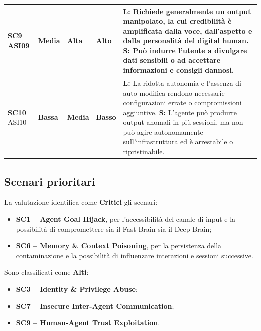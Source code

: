 \documentclass[11pt,a4paper]{article}
\newcommand{\alto}{\cellcolor{RiskHigh}\textbf{Alto}}
\newcommand{\basso}{\cellcolor{RiskLow}\textbf{Basso}}
\begin{document}
\begin{longtable}{
    |C{1.45cm}|
    C{1.65cm}|
    C{1.65cm}|
    C{1.45cm}|
    L{\dimexpr\textwidth-1.45cm-1.65cm-1.65cm-1.45cm-10\arrayrulewidth\relax}|
}
\textbf{SC9} \newline ASI09
&
\textbf{Media}
&
\textbf{Alta}
&
\alto
&
\textbf{L:}
Richiede generalmente un output manipolato, la cui credibilità è
amplificata dalla voce, dall'aspetto e dalla personalità del digital
human.
\newline \textbf{S:}
Può indurre l'utente a divulgare dati sensibili o ad accettare
informazioni e consigli dannosi.
\\
\hline


\textbf{SC10} \newline ASI10
&
\textbf{Bassa}
&
\textbf{Media}
&
\basso
&
\textbf{L:}
La ridotta autonomia e l'assenza di auto-modifica rendono necessarie
configurazioni errate o compromissioni aggiuntive.
\newline \textbf{S:}
L'agente può produrre output anomali in più sessioni, ma non può agire
autonomamente sull'infrastruttura ed è arrestabile o ripristinabile.
\\
\hline

\end{longtable}
\endgroup





\subsection{Scenari prioritari}

La valutazione identifica come \textbf{Critici} gli scenari:

\begin{itemize}
    \item \textbf{SC1 -- Agent Goal Hijack}, per l'accessibilità del
    canale di input e la possibilità di compromettere sia il
    Fast-Brain sia il Deep-Brain;

    \item \textbf{SC6 -- Memory \& Context Poisoning}, per la
    persistenza della contaminazione e la possibilità di influenzare
    interazioni e sessioni successive.
\end{itemize}

Sono classificati come \textbf{Alti}:

\begin{itemize}
    \item \textbf{SC3 -- Identity \& Privilege Abuse};
    \item \textbf{SC7 -- Insecure Inter-Agent Communication};
    \item \textbf{SC9 -- Human-Agent Trust Exploitation}.
\end{itemize}
\end{document}
